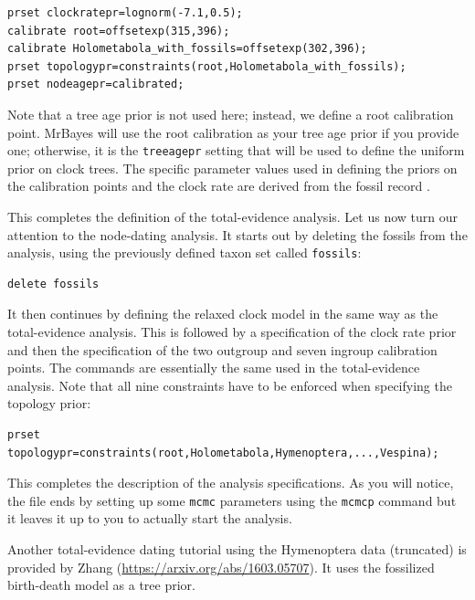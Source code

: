 \documentclass[12pt]{book}
\begin{document}
\begin{Verbatim}
prset clockratepr=lognorm(-7.1,0.5);
calibrate root=offsetexp(315,396);
calibrate Holometabola_with_fossils=offsetexp(302,396);
prset topologypr=constraints(root,Holometabola_with_fossils);
prset nodeagepr=calibrated;
\end{Verbatim}

Note that a tree age prior is not used here; instead, we define a root calibration point. MrBayes
will use the root calibration as your tree age prior if you provide one; otherwise, it is the
\texttt{treeagepr} setting that will be used to define the uniform prior on clock trees. The
specific parameter values used in defining the priors on the calibration points and the clock rate
are derived from the fossil record \citep{ronquist12b}.

This completes the definition of the total-evidence analysis. Let us now turn our attention to the
node-dating analysis. It starts out by deleting the fossils from the analysis, using the previously
defined taxon set called \texttt{fossils}:

\begin{Verbatim}
delete fossils
\end{Verbatim}
It then continues by defining the relaxed clock model in the same way as the total-evidence
analysis. This is followed by a specification of the clock rate prior and then the specification of
the two outgroup and seven ingroup calibration points. The commands are essentially the same used
in the total-evidence analysis. Note that all nine constraints have to be enforced when specifying
the topology prior:

\begin{Verbatim}
prset topologypr=constraints(root,Holometabola,Hymenoptera,...,Vespina);
\end{Verbatim}

This completes the description of the analysis specifications. As you will notice, the file ends by
setting up some \texttt{mcmc} parameters using the \texttt{mcmcp} command but it leaves it up to
you to actually start the analysis.

Another total-evidence dating tutorial using the Hymenoptera data (truncated) is provided by Zhang
(\url{https://arxiv.org/abs/1603.05707}). It uses the fossilized birth-death model
\citep{Stadler:2010fn,Heath:2014hn,Zhang:2016kf} as a tree prior.
\end{document}
